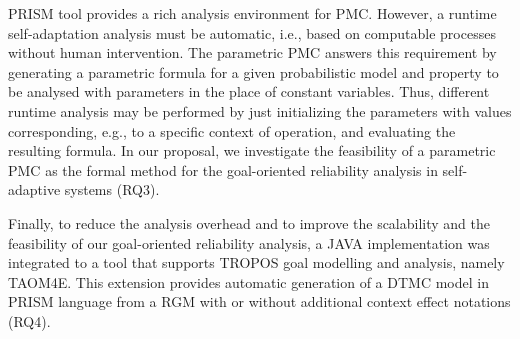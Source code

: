 PRISM tool provides a rich analysis environment for PMC. However, a runtime self-adaptation analysis must be automatic, i.e., based on computable processes without human intervention. The parametric PMC answers this requirement by generating a parametric formula for a given probabilistic model and property to be analysed with parameters in the place of constant variables. Thus, different runtime analysis may be performed by just initializing the parameters with values corresponding, e.g., to a specific context of operation, and evaluating the resulting formula. In our proposal, we investigate the feasibility of a parametric PMC as the formal method for the goal-oriented reliability analysis in self-adaptive systems (RQ3).

Finally, to reduce the analysis overhead and to improve the scalability and the feasibility of our goal-oriented reliability analysis, a JAVA implementation was integrated to a tool that supports TROPOS goal modelling and analysis, namely TAOM4E. This extension provides automatic generation of a DTMC model in PRISM language from a RGM with or without additional context effect notations (RQ4).








